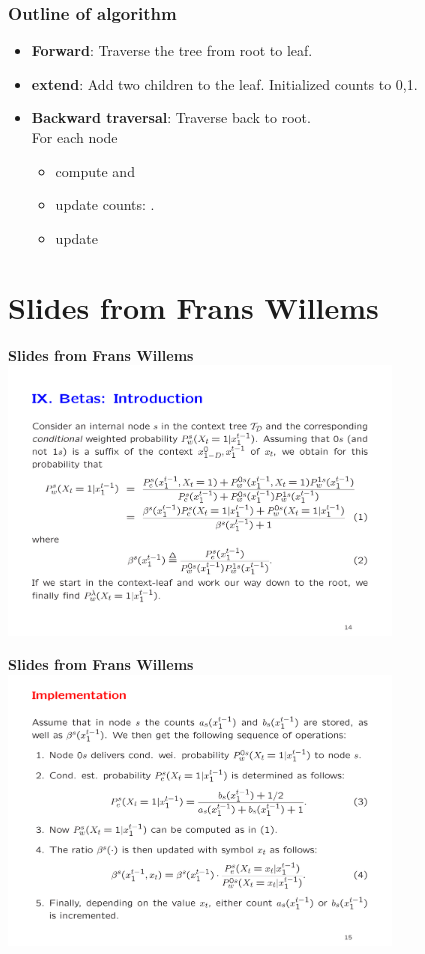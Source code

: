 \documentclass{beamer}
\begin{document}
\begin{frame}
\frametitle{Outline of algorithm}
\begin{itemize}
\item {\bf Forward}: Traverse the tree from root to leaf.
\item {\bf extend}: Add two children to the leaf. Initialized counts
  to 0,1.
\item {\bf Backward traversal}: Traverse back to root.\\
  For each node
  \begin{itemize}
  \item compute  and
    \item update counts: .
    \item update 
    \end{itemize}
  \end{itemize}
\end{frame}

\section{Slides from Frans Willems}
\newpage
\bf{Slides from Frans Willems}\\
\includegraphics[width=4in]{figures/Betas1.pdf}

\newpage
\bf{Slides from Frans Willems}\\
\includegraphics[width=4in]{figures/Betas2.pdf}
\end{document}
